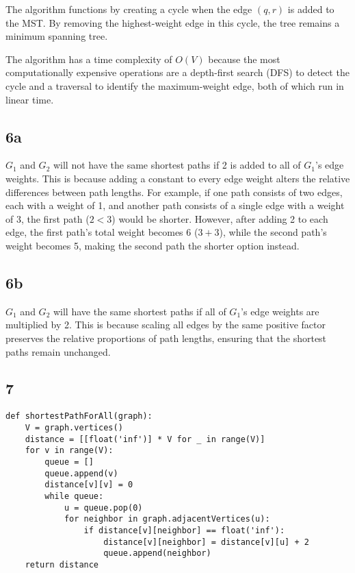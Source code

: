 \documentclass{article}
\begin{document}
The algorithm functions by creating a cycle when the edge $(q, r)$ is added to the MST. By removing the highest-weight edge in this cycle, the tree remains a minimum spanning tree.

The algorithm has a time complexity of $O(V)$ because the most computationally expensive operations are a depth-first search (DFS) to detect the cycle and a traversal to identify the maximum-weight edge, both of which run in linear time.

\subsection*{6a}
$G_1$ and $G_2$ will not have the same shortest paths if 2 is added to all of $G_1$'s edge weights. This is because adding a constant to every edge weight alters the relative differences between path lengths. For example, if one path consists of two edges, each with a weight of 1, and another path consists of a single edge with a weight of 3, the first path ($2 < 3$) would be shorter. However, after adding 2 to each edge, the first path’s total weight becomes 6 ($3 + 3$), while the second path’s weight becomes 5, making the second path the shorter option instead.

\subsection*{6b}
$G_1$ and $G_2$ will have the same shortest paths if all of $G_1$'s edge weights are multiplied by 2. This is because scaling all edges by the same positive factor preserves the relative proportions of path lengths, ensuring that the shortest paths remain unchanged.


\pagebreak
\subsection*{7}

\begin{verbatim}
def shortestPathForAll(graph):
    V = graph.vertices()
    distance = [[float('inf')] * V for _ in range(V)]
    for v in range(V):
        queue = []
        queue.append(v)
        distance[v][v] = 0
        while queue:
            u = queue.pop(0)
            for neighbor in graph.adjacentVertices(u):
                if distance[v][neighbor] == float('inf'):
                    distance[v][neighbor] = distance[v][u] + 2
                    queue.append(neighbor)
    return distance
\end{verbatim}
\end{document}
